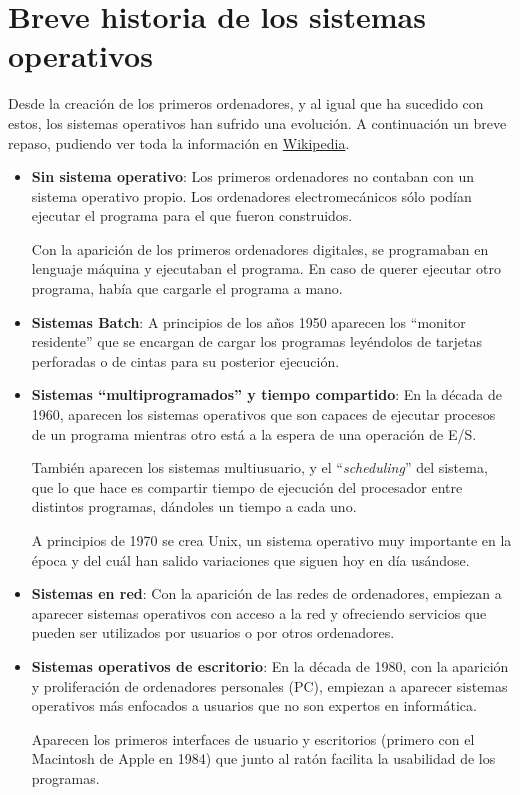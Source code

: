 \section{Breve historia de los sistemas operativos}

Desde la creación de los primeros ordenadores, y al igual que ha sucedido con estos, los sistemas operativos han sufrido una evolución. A continuación un breve repaso, pudiendo ver toda la información en  \href{https://es.wikipedia.org/wiki/Historia_de_los_sistemas_operativos}{Wikipedia}.

\begin{itemize}
    \item \textbf{Sin sistema operativo}: Los primeros ordenadores no contaban con un sistema operativo propio. Los ordenadores electromecánicos sólo podían ejecutar el programa para el que fueron construidos.

    Con la aparición de los primeros ordenadores digitales, se programaban en lenguaje máquina y ejecutaban el programa. En caso de querer ejecutar otro programa, había que cargarle el programa a mano.

    \item \textbf{Sistemas Batch}: A principios de los años 1950 aparecen los “monitor residente” que se encargan de cargar los programas leyéndolos de tarjetas perforadas o de cintas para su posterior ejecución.

    \item \textbf{Sistemas “multiprogramados” y tiempo compartido}: En la década de 1960, aparecen los sistemas operativos que son capaces de ejecutar procesos de un programa mientras otro está a la espera de una operación de E/S.

    También aparecen los sistemas multiusuario, y el “\textit{scheduling}” del sistema, que lo que hace es compartir tiempo de ejecución del procesador entre distintos programas, dándoles un tiempo a cada uno.

    A principios de 1970 se crea Unix, un sistema operativo muy importante en la época y del cuál han salido variaciones que siguen hoy en día usándose.

    \item \textbf{Sistemas en red}: Con la aparición de las redes de ordenadores, empiezan a aparecer sistemas operativos con acceso a la red y ofreciendo servicios que pueden ser utilizados por usuarios o por otros ordenadores.

    \item \textbf{Sistemas operativos de escritorio}: En la década de 1980, con la aparición y proliferación de ordenadores personales (PC), empiezan a aparecer sistemas operativos más enfocados a usuarios que no son expertos en informática.

    Aparecen los primeros interfaces de usuario y escritorios (primero con el Macintosh de Apple en 1984) que junto al ratón facilita la usabilidad de los programas.
\end{itemize}







%
%
%